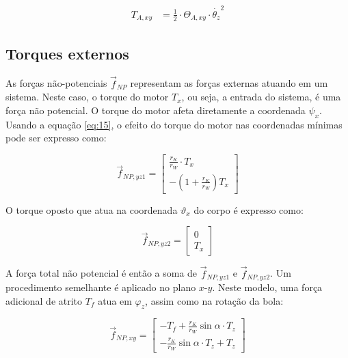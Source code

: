 \begin{equation*}
    \begin{aligned}
        T_{A,xy} & = \frac{1}{2} \cdot \Theta_{A,xy} \cdot \dot {\theta_z}^2 
    \end{aligned}
\end{equation*}

\subsection{Torques externos}

As forças não-potenciais \( \vec{f}_{NP} \) representam as forças externas atuando em um sistema. Neste caso, o torque do motor \( T_x \), ou seja, a entrada do sistema, é uma força não potencial. O torque do motor afeta diretamente a coordenada \( \psi_x \). Usando a equação \ref{eq:15}, o efeito do torque do motor nas coordenadas mínimas pode ser expresso como:

\begin{equation}
\label{eq:17}
\vec{f}_{NP,yz1} = 
\begin{bmatrix}
\frac{r_K}{r_W} \cdot T_x \\
-\left(1 + \frac{r_K}{r_W}\right) T_x
\end{bmatrix}
\end{equation}

O torque oposto que atua na coordenada \( \vartheta_x \) do corpo é expresso como:

\begin{equation}
\label{eq:18}
\vec{f}_{NP,yz2} =
\begin{bmatrix}
0 \\
T_x
\end{bmatrix}
\end{equation}

A força total não potencial é então a soma de \( \vec{f}_{NP,yz1} \) e \( \vec{f}_{NP,yz2} \). Um procedimento semelhante é aplicado no plano \( x \)-\( y \). Neste modelo, uma força adicional de atrito \( T_f \) atua em \( \varphi_z \), assim como na rotação da bola:

\begin{equation}
\label{eq:19}
\vec{f}_{NP,xy} =
\begin{bmatrix}
-T_f + \frac{r_K}{r_W} \sin{\alpha} \cdot T_z \\
-\frac{r_K}{r_W} \sin{\alpha} \cdot T_z + T_z
\end{bmatrix}
\end{equation}

